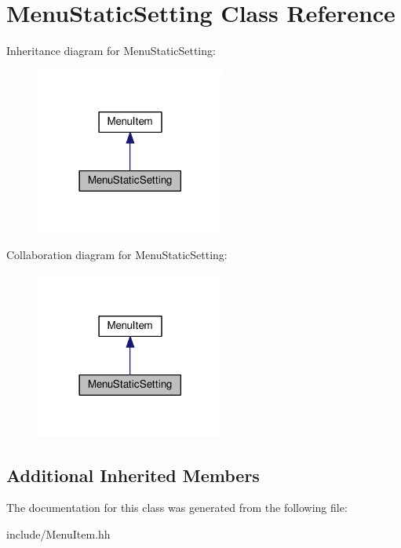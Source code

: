 \hypertarget{classMenuStaticSetting}{}\section{Menu\+Static\+Setting Class Reference}
\label{classMenuStaticSetting}


Inheritance diagram for Menu\+Static\+Setting\+:\nopagebreak
\begin{figure}[H]
\begin{center}
\leavevmode
\includegraphics[width=177pt]{classMenuStaticSetting__inherit__graph}
\end{center}
\end{figure}


Collaboration diagram for Menu\+Static\+Setting\+:\nopagebreak
\begin{figure}[H]
\begin{center}
\leavevmode
\includegraphics[width=177pt]{classMenuStaticSetting__coll__graph}
\end{center}
\end{figure}
\subsection*{Additional Inherited Members}


The documentation for this class was generated from the following file\+:\begin{DoxyCompactItemize}
\item 
include/Menu\+Item.\+hh\end{DoxyCompactItemize}
